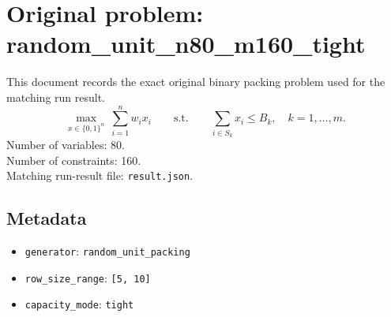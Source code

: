 \documentclass[11pt]{article}
\begin{document}
\section*{Original problem: random\_unit\_n80\_m160\_tight}
This document records the exact original binary packing problem used for the matching run result.
\[
\max_{x\in\{0,1\}^n}\ \sum_{i=1}^n w_i x_i
\qquad\text{s.t.}\qquad
\sum_{i\in S_k} x_i \le B_k,\quad k=1,\dots,m.
\]
Number of variables: 80.\\
Number of constraints: 160.\\
Matching run-result file: \texttt{result.json}.
\subsection*{Metadata}
\begin{itemize}
\item \texttt{generator}: \texttt{random\_unit\_packing}
\item \texttt{row\_size\_range}: \texttt{[5, 10]}
\item \texttt{capacity\_mode}: \texttt{tight}
\end{itemize}
\end{document}
